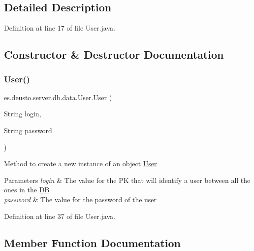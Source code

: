 \subsection{Detailed Description}


Definition at line 17 of file User.\+java.



\subsection{Constructor \& Destructor Documentation}
\mbox{\label{classes_1_1deusto_1_1server_1_1db_1_1data_1_1_user_accf4cd75adc5bfc6cd376a1714517ba9}} 
\subsubsection{\texorpdfstring{User()}{User()}}
{\footnotesize\ttfamily es.\+deusto.\+server.\+db.\+data.\+User.\+User (\begin{DoxyParamCaption}\item[{String}]{login,  }\item[{String}]{password }\end{DoxyParamCaption})}

Method to create a new instance of an object \hyperlink{classes_1_1deusto_1_1server_1_1db_1_1data_1_1_user}{User} 
\begin{DoxyParams}{Parameters}
{\em login} & The value for the PK that will identify a user between all the ones in the \hyperlink{classes_1_1deusto_1_1server_1_1db_1_1_d_b}{DB} \\
\hline
{\em password} & The value for the password of the user \\
\hline
\end{DoxyParams}


Definition at line 37 of file User.\+java.



\subsection{Member Function Documentation}
\mbox{\label{classes_1_1deusto_1_1server_1_1db_1_1data_1_1_user_a0fbb3860281941edb6832d0424910cd7}} 
